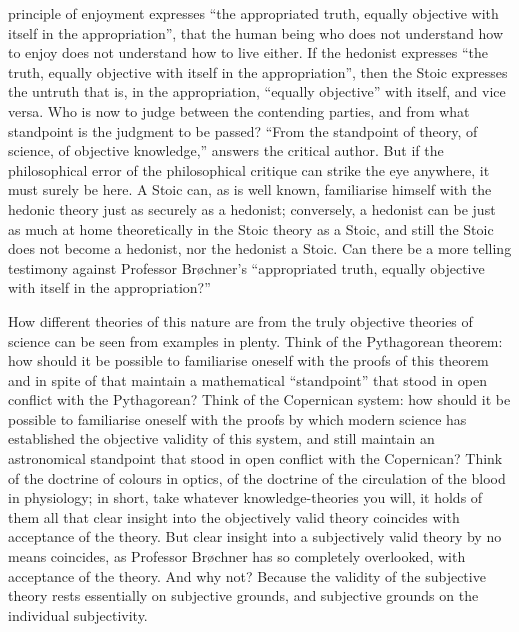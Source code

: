 \documentclass[12pt]{book}
\newcommand{\opage}[1]{\marginnote{\footnotesize\textit{[#1]}}}
\begin{document}
principle of enjoyment expresses ``the appropriated truth, equally objective
with itself in the appropriation'', that the human being who does
not understand how to enjoy does not understand how to live either. If the
hedonist expresses ``the truth, equally objective with itself in the
appropriation'', then the Stoic expresses the untruth that is, in the
appropriation, ``equally objective'' with itself, and vice versa. Who is now
to judge between the contending parties, and from what standpoint is the
judgment to be passed? ``From the standpoint of theory, of science, of
objective knowledge,'' answers the critical author. But if the philosophical
error of the philosophical critique can strike the eye anywhere, it must
surely be here. A Stoic can, as is well known, familiarise himself with the
hedonic theory just as securely as a hedonist; conversely, a hedonist can be
just as much at home theoretically in the Stoic theory as a Stoic, and still
the Stoic does not become a hedonist, nor the hedonist a Stoic. Can there be
a more telling testimony against Professor Brøchner's ``appropriated truth,
equally objective with itself in the appropriation?''

\opage{14}\setcounter{footnote}{0}%
How different theories of this nature are from the truly objective theories
of science can be seen from examples in plenty. Think of the Pythagorean
theorem: how should it be possible to familiarise oneself with the proofs of
this theorem and in spite of that maintain a mathematical ``standpoint'' that
stood in open conflict with the Pythagorean? Think of the Copernican system:
how should it be possible to familiarise oneself with the proofs by which
modern science has established the objective validity of this system, and
still maintain an astronomical standpoint that stood in open conflict with
the Copernican? Think of the doctrine of colours in optics, of the doctrine
of the circulation of the blood in physiology; in short, take whatever
knowledge-theories you will, it holds of them all that clear insight into
the objectively valid theory coincides with acceptance of the theory. But
clear insight into a subjectively valid theory by no means coincides, as
Professor Brøchner has so completely overlooked, with acceptance of the
theory. And why not? Because the validity of the subjective theory rests
essentially on subjective grounds, and subjective grounds on the individual
subjectivity.
\end{document}
